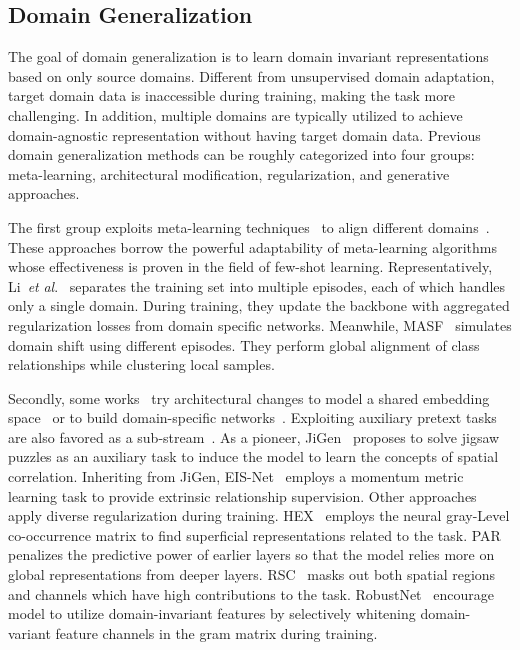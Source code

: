 \documentclass[sigconf]{acmart}
\newcommand{\etal}{\textit{et} \textit{al}.}
\begin{document}
\subsection{Domain Generalization}

The goal of domain generalization is to learn domain invariant representations based on only source domains. Different from unsupervised domain adaptation, target domain data is inaccessible during training, making the task more challenging.
In addition, multiple domains are typically utilized to achieve domain-agnostic representation without having target domain data.
Previous domain generalization methods can be roughly categorized into four groups: meta-learning, architectural modification, regularization, and generative approaches.

The first group exploits meta-learning techniques~\cite{finn2017model, ravi2016optimization} to align different domains~\cite{Li2018LearningTG, balaji2018metareg, Li2019EpisodicTF, dou2019domain}. These approaches borrow the powerful adaptability of meta-learning algorithms whose effectiveness is proven in the field of few-shot learning. Representatively, Li~\etal~\cite{Li2019EpisodicTF} separates the training set into multiple episodes, each of which handles only a single domain.
During training, they update the backbone with aggregated regularization losses from domain specific networks.
Meanwhile, MASF~\cite{dou2019domain} simulates domain shift using different episodes. They perform global alignment of class relationships while clustering local samples.

Secondly, some works~\cite{Motiian2017UnifiedDS, li2018domain, ghifary2015domain, Seo2020LearningTO, Chattopadhyay2020LearningTB, xu2021fourier} try architectural changes to model a shared embedding space~\cite{Motiian2017UnifiedDS, li2018domain, ghifary2015domain} or to build domain-specific networks~\cite{Chattopadhyay2020LearningTB, Seo2020LearningTO}. Exploiting auxiliary pretext tasks are also favored as a sub-stream~\cite{carlucci2019domain, Wang2020LearningFE}. As a pioneer, JiGen~\cite{carlucci2019domain} proposes to solve jigsaw puzzles as an auxiliary task to induce the model to learn the concepts of spatial correlation. Inheriting from JiGen, EIS-Net~\cite{Wang2020LearningFE} employs a momentum metric learning task to provide extrinsic relationship supervision. 
Other approaches~\cite{wang2018learning, wang2019learning, Huang2020SelfChallengingIC, shi2020informative, choi2021robustnet} apply diverse regularization during training. HEX~\cite{wang2018learning} employs the neural gray-Level co-occurrence matrix to find superficial representations related to the task. PAR~\cite{wang2019learning} penalizes the predictive power of earlier layers so that the model relies more on global representations from deeper layers. RSC~\cite{Huang2020SelfChallengingIC} masks out both spatial regions and channels which have high contributions to the task. RobustNet~\cite{choi2021robustnet} encourage model to utilize domain-invariant features by selectively whitening domain-variant feature channels in the gram matrix during training.
\end{document}
